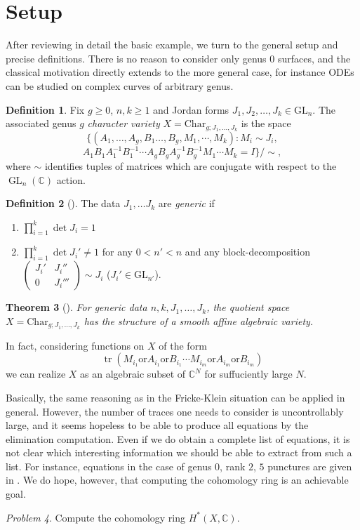\documentclass[12pt]{amsart}
\newtheorem{theorem}{Theorem}[section]
\theoremstyle{definition}
\newtheorem{definition}[theorem]{Definition}
\theoremstyle{remark}
\newtheorem{problem}[theorem]{Problem}
\numberwithin{equation}{section}
\newcommand{\BC}{\mathbb C}
\DeclareMathOperator{\GL}{GL}
\DeclareMathOperator{\trace}{tr}
\begin{document}
	\section{Setup}
	After reviewing in detail the basic example, we turn to the general setup and precise definitions. There is no reason to consider only genus $0$ surfaces, and the classical motivation directly extends to the more general case, for instance ODEs can be studied on complex curves of arbitrary genus.
	
	\begin{definition}
		Fix $g\geq 0$, $n, k\geq 1$ and Jordan forms $J_1, J_2, \ldots, J_k \in\mathrm{GL}_n$. The associated genus $g$ \emph{character variety} $X=\mathrm{Char}_{g;J_1,\dots,J_k}$ is the space
		\[
		\{(A_1,\ldots,A_g,B_1\ldots,B_g,M_1, \cdots, M_k): M_i\sim J_i,
		\]
		\[ A_1 B_1 A_1^{-1} B_1^{-1} \cdots A_g B_g A_g^{-1} B_g^{-1} M_1 \cdots M_k = I\}/\sim,
		\]
		where $\sim$ identifies tuples of matrices which are conjugate with respect to the $\GL_n(\BC)$ action.
	\end{definition}
	
	
	\begin{definition}[\cite{hausel2011arithmetic}]\label{def:generic}
		The data $J_1,\ldots J_k$ are \emph{generic} if 
		\begin{enumerate}
			\item $\prod_{i=1}^k \det J_i=1$
			\item $\prod_{i=1}^k \det J_i'\neq 1$ for any $0<n'<n$ and any block-decomposition $\left(\begin{array}{c|c} J_i' & J_i''\\ \hline 0 & J_i'''\end{array}\right)\sim J_i$ ($J_i'\in \mathrm{GL}_{n'}$).
		\end{enumerate}
	\end{definition}
	
	\begin{theorem}[\cite{hausel2011arithmetic}]
		For generic data $n, k, J_1, \ldots, J_k$, the quotient space $X=\mathrm{Char}_{g;J_1,\dots,J_k}$ has the structure of a smooth affine algebraic variety.
	\end{theorem}
	In fact, considering functions on $X$ of the form
	\[
	\trace(M_{i_1}\text{or} A_{i_1} \text{or} B_{i_1} \cdots M_{i_m}\text{or} A_{i_m} \text{or} B_{i_m})
	\]
	we can realize $X$ as an algebraic subset of $\mathbb{C}^N$ for suffuciently large $N$.
	
	Basically, the same reasoning as in the Fricke-Klein situation can be applied in general. However, the number of traces one needs to consider is uncontrollably large, and it seems hopeless to be able to produce all equations by the elimination computation. Even if we do obtain a complete list of equations, it is not clear which interesting information we should be able to extract from such a list. For instance, equations in the case of genus $0$, rank $2$, $5$ punctures are given in \cite{simpson2017explicit}. We do hope, however, that computing the cohomology ring is an achievable goal.
	\begin{problem}
		Compute the cohomology ring $H^*(X,\mathbb{C})$.
	\end{problem}
	
\end{document}

